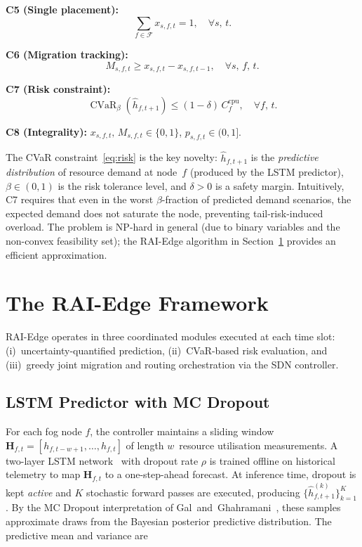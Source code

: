 \documentclass[conference]{IEEEtran}
\DeclareMathOperator{\CVaR}{CVaR}
\newcommand{\F}{\mathcal{F}}
\begin{document}
\noindent\textbf{C5 (Single placement):}
\begin{equation}
  \sum_{f \in \F} x_{s,f,t} = 1, \quad \forall s,\, t.
\end{equation}

\noindent\textbf{C6 (Migration tracking):}
\begin{equation}
  M_{s,f,t} \geq x_{s,f,t} - x_{s,f,t-1}, \quad \forall s,\,f,\,t.
\end{equation}

\noindent\textbf{C7 (Risk constraint):}
\begin{equation}
  \CVaR_{\beta}\!\left(\hat{h}_{f,t+1}\right) \leq
  (1-\delta)\,C_f^{\mathrm{cpu}}, \quad \forall f,\, t.
  \label{eq:risk}
\end{equation}

\noindent\textbf{C8 (Integrality):}
$x_{s,f,t},\, M_{s,f,t} \in \{0,1\}$, $p_{s,f,t} \in (0,1]$.

The CVaR constraint~\eqref{eq:risk} is the key novelty:
$\hat{h}_{f,t+1}$ is the \emph{predictive distribution} of resource
demand at node~$f$ (produced by the LSTM predictor),
$\beta \in (0,1)$ is the risk tolerance level, and $\delta > 0$ is a
safety margin. Intuitively, C7 requires that even in the worst
$\beta$-fraction of predicted demand scenarios, the expected demand
does not saturate the node, preventing tail-risk-induced overload.
The problem is NP-hard in general (due to binary variables and
the non-convex feasibility set); the RAI-Edge algorithm in
Section~\ref{sec:raiEdge} provides an efficient approximation.

\section{The RAI-Edge Framework}
\label{sec:raiEdge}

RAI-Edge operates in three coordinated modules executed at each
time slot: (i)~uncertainty-quantified prediction, (ii)~CVaR-based
risk evaluation, and (iii)~greedy joint migration and routing
orchestration via the SDN controller.

\subsection{LSTM Predictor with MC Dropout}

For each fog node $f$, the controller maintains a sliding window
$\mathbf{H}_{f,t} = [h_{f,t-w+1}, \ldots, h_{f,t}]$ of length
$w$~resource utilisation measurements. A two-layer LSTM
network~\cite{hochreiter1997long} with dropout rate $\rho$ is trained
offline on historical telemetry to map $\mathbf{H}_{f,t}$ to a
one-step-ahead forecast. At inference time, dropout is kept
\emph{active} and $K$ stochastic forward passes are executed,
producing $\{\hat{h}_{f,t+1}^{(k)}\}_{k=1}^{K}$. By the MC Dropout
interpretation of Gal~and~Ghahramani~\cite{gal2016dropout}, these
samples approximate draws from the Bayesian posterior predictive
distribution. The predictive mean and variance are
\end{document}
